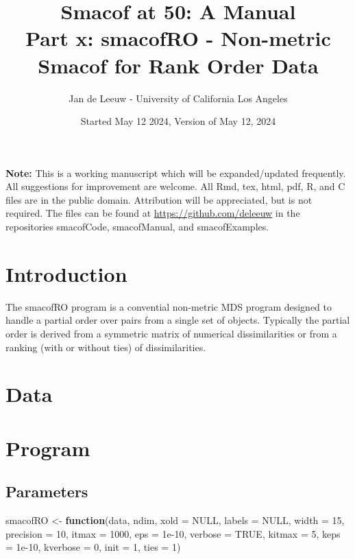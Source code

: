 \documentclass[
  12pt,
]{article}
\title{Smacof at 50: A Manual\\
Part x: smacofRO - Non-metric Smacof for Rank Order Data}
\author{Jan de Leeuw - University of California Los Angeles}
\date{Started May 12 2024, Version of May 12, 2024}
\newenvironment{Shaded}{\begin{snugshade}}{\end{snugshade}}
\newcommand{\AttributeTok}[1]{\textcolor[rgb]{0.13,0.29,0.53}{#1}}
\newcommand{\ConstantTok}[1]{\textcolor[rgb]{0.56,0.35,0.01}{#1}}
\newcommand{\ControlFlowTok}[1]{\textcolor[rgb]{0.13,0.29,0.53}{\textbf{#1}}}
\newcommand{\DecValTok}[1]{\textcolor[rgb]{0.00,0.00,0.81}{#1}}
\newcommand{\FloatTok}[1]{\textcolor[rgb]{0.00,0.00,0.81}{#1}}
\newcommand{\NormalTok}[1]{#1}
\newcommand{\OtherTok}[1]{\textcolor[rgb]{0.56,0.35,0.01}{#1}}
\begin{document}
\maketitle

{
\setcounter{tocdepth}{3}
\tableofcontents
}
\textbf{Note:} This is a working manuscript which will be expanded/updated
frequently. All suggestions for improvement are welcome. All Rmd, tex,
html, pdf, R, and C files are in the public domain. Attribution will be
appreciated, but is not required. The files can be found at
\url{https://github.com/deleeuw} in the repositories smacofCode, smacofManual, and smacofExamples.

\section{Introduction}\label{introduction}

The smacofRO program is a convential non-metric MDS program designed
to handle a partial order over pairs from a single set of objects.
Typically the partial order is derived from a symmetric matrix of
numerical dissimilarities or from a ranking (with or without ties)
of dissimilarities.

\section{Data}\label{data}

\section{Program}\label{program}

\subsection{Parameters}\label{parameters}

\begin{Shaded}
\begin{Highlighting}[]
\NormalTok{smacofRO }\OtherTok{\textless{}{-}} \ControlFlowTok{function}\NormalTok{(data,}
\NormalTok{                     ndim,}
                     \AttributeTok{xold =} \ConstantTok{NULL}\NormalTok{,}
                     \AttributeTok{labels =} \ConstantTok{NULL}\NormalTok{,}
                     \AttributeTok{width =} \DecValTok{15}\NormalTok{,}
                     \AttributeTok{precision =} \DecValTok{10}\NormalTok{,}
                     \AttributeTok{itmax =} \DecValTok{1000}\NormalTok{,}
                     \AttributeTok{eps =} \FloatTok{1e{-}10}\NormalTok{,}
                     \AttributeTok{verbose =} \ConstantTok{TRUE}\NormalTok{,}
                     \AttributeTok{kitmax =} \DecValTok{5}\NormalTok{,}
                     \AttributeTok{keps =} \FloatTok{1e{-}10}\NormalTok{,}
                     \AttributeTok{kverbose =} \DecValTok{0}\NormalTok{,}
                     \AttributeTok{init =} \DecValTok{1}\NormalTok{,}
                     \AttributeTok{ties =} \DecValTok{1}\NormalTok{)}
\end{Highlighting}
\end{Shaded}
\end{document}
